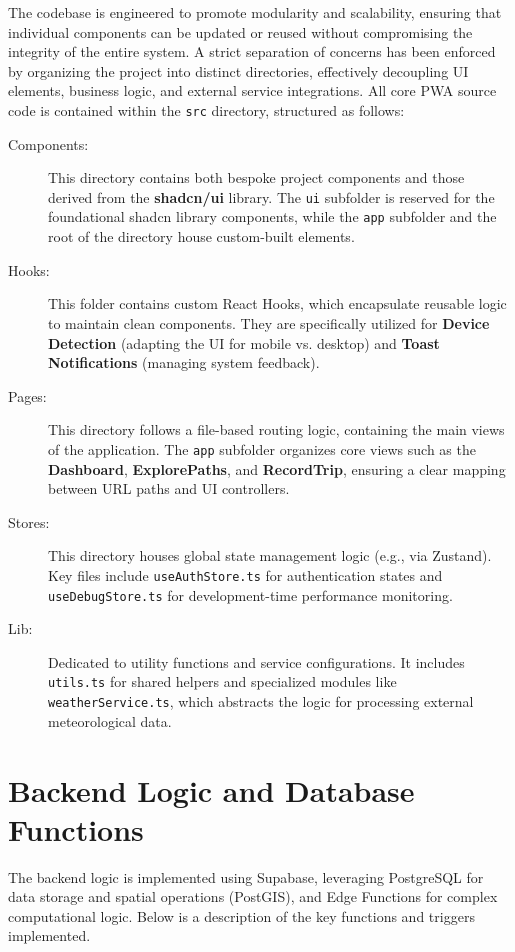 
The codebase is engineered to promote modularity and scalability, ensuring that individual components can be updated or reused without compromising the integrity of the entire system. A strict separation of concerns has been enforced by organizing the project into distinct directories, effectively decoupling UI elements, business logic, and external service integrations. All core PWA source code is contained within the \texttt{src} directory, structured as follows:

\begin{description}
    \item[Components:] This directory contains both bespoke project components and those derived from the \textbf{shadcn/ui} library. The \texttt{ui} subfolder is reserved for the foundational shadcn library components, while the \texttt{app} subfolder and the root of the directory house custom-built elements.
    \item[Hooks:] This folder contains custom React Hooks, which encapsulate reusable logic to maintain clean components. They are specifically utilized for \textbf{Device Detection} (adapting the UI for mobile vs. desktop) and \textbf{Toast Notifications} (managing system feedback).
    \item[Pages:] This directory follows a file-based routing logic, containing the main views of the application. The \texttt{app} subfolder organizes core views such as the \textbf{Dashboard}, \textbf{ExplorePaths}, and \textbf{RecordTrip}, ensuring a clear mapping between URL paths and UI controllers.
    \item[Stores:] This directory houses global state management logic (e.g., via Zustand). Key files include \texttt{useAuthStore.ts} for authentication states and \texttt{useDebugStore.ts} for development-time performance monitoring.
    \item[Lib:] Dedicated to utility functions and service configurations. It includes \texttt{utils.ts} for shared helpers and specialized modules like \texttt{weatherService.ts}, which abstracts the logic for processing external meteorological data.
\end{description}

\section{Backend Logic and Database Functions}
The backend logic is implemented using Supabase, leveraging PostgreSQL for data storage and spatial operations (PostGIS), and Edge Functions for complex computational logic. Below is a description of the key functions and triggers implemented.

